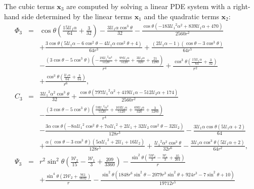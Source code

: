 \documentclass[final]{elsarticle}
\newcommand\bx{\boldsymbol{x}}
\newcommand\cU{\mathscr{U}}
\newcommand\cW{\mathscr{W}}
\begin{document}
\begin{appendix}
The cubic terms $\bx_3$ are computed by solving a linear PDE system 
with a right-hand side determined by the linear terms $\bx_1$ and the quadratic terms $\bx_2$:
\begin{eqnarray*}
\varPhi_3 &=& \cos\theta \left(\frac{15 \cU_1\alpha}{64} + \frac{3}{32}\right) - \frac{3 \cU_1\alpha {\cos}^3\theta}{32} - \frac{\cos\theta \left( - 183 {\cU_1}^2\alpha^2 + 839 \cU_1\alpha + 470\right)}{2560 r^2} \\ 
&&+ \frac{3 \cos\theta \left(5 \cU_1\alpha - 6 {\cos^2\theta} - 4 \cU_1\alpha {\cos^2\theta} + 4\right)}{64 r^3} + \frac{\left(2 \cU_1\alpha - 1\right) \left(\cos\theta - 3 {\cos}^3\theta\right)}{64 r^5} 
\\ 
&&- \frac{\left(3 \cos\theta - 5 {\cos}^3\theta\right) \left( - \frac{19 {\cU_1}^2\alpha^2}{5120} + \frac{97 \cU_1\alpha}{5120} + \frac{3 \cU_2\alpha}{320} + \frac{21}{1280}\right)}{r^4} + \frac{{\cos}^3\theta \left(\frac{15 \cU_1\alpha}{64} + \frac{3}{32}\right)}{r^2} \\ 
&&+ \frac{{\cos}^3\theta \left(\frac{\cU_1\alpha}{64} + \frac{3}{64}\right)}{r^6},
\\
C_3 &=&
\frac{3 {{\cU_1}}^2\alpha^2 {\cos^3\theta}}{32} + \frac{\cos\theta \left(797 {{\cU_1}}^2\alpha^2 + 419 {\cU_1}\alpha - 512 {\cU_2}\alpha + 174\right)}{2560 r^2} \\
&&- \frac{\left(3 \cos\theta - 5 {\cos^3\theta}\right) \left(\frac{59 {{\cU_1}}^2\alpha^2}{5120} + \frac{103 {\cU_1}\alpha}{5120} + \frac{69 {\cU_2}\alpha}{320} + \frac{3}{1280}\right)}{r^4} \\
&&- \frac{3\alpha \cos\theta \left( - 8\alpha {{\cU_1}}^2 {\cos^2\theta} + 7\alpha {{\cU_1}}^2 + 2 {\cU_1} + 32 {\cU_2} {\cos^2\theta} - 32 {\cU_2}\right)}{128 r^3} - \frac{3 {\cU_1}\alpha \cos\theta \left(5 {\cU_1}\alpha + 2\right)}{64} \\
&&+ \frac{\alpha \left(\cos\theta - 3 {\cos^3\theta}\right) \left(5\alpha {{\cU_1}}^2 + 2 {\cU_1} + 16 {\cU_2}\right)}{128 r^5} + \frac{{{\cU_1}}^2\alpha^2 {\cos^3\theta}}{32 r^6} - \frac{3 {\cU_1}\alpha {\cos^3\theta} \left(5 {\cU_1}\alpha + 2\right)}{64 r^2},
\\
\Psi_3 &=&
r^2 {\sin^2\theta} \left(\frac{{\cW_2}}{15} - \frac{{\cW_1}}{3} + \frac{209}{3360}\right) 
 - \frac{{\sin^2\theta} \left(\frac{5 {\cW_2}}{3} - \frac{{\cW_1}}{3} + \frac{35}{264}\right)}{r}
\\ && + \frac{{\sin^4\theta} \left(2 {\cW_2} + \frac{761}{5632}\right)}{r} - \frac{{\sin^2\theta} \left(1848 r^6 {\sin^2\theta} - 2079 r^3 {\sin^2\theta} + 924 r^3 - 7 {\sin^2\theta} + 10\right)}{19712 r^5} 

\end{eqnarray*}
\end{appendix}
\end{document}

